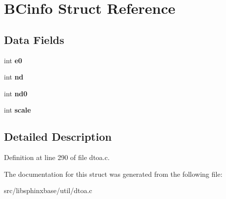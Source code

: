 \section{B\-Cinfo Struct Reference}
\label{structBCinfo}
\subsection*{Data Fields}
\begin{DoxyCompactItemize}
\item 
int {\bfseries e0}\label{structBCinfo_a3465f7cb1203532a3dc29c5a01e05526}

\item 
int {\bfseries nd}\label{structBCinfo_ac189da9f6f82f8846017c40e5872e4a7}

\item 
int {\bfseries nd0}\label{structBCinfo_a9d30accd41a03e88ebd52591258b76fa}

\item 
int {\bfseries scale}\label{structBCinfo_a59b720f0388e80e21b950723aa53b56e}

\end{DoxyCompactItemize}


\subsection{Detailed Description}


Definition at line 290 of file dtoa.\-c.



The documentation for this struct was generated from the following file\-:\begin{DoxyCompactItemize}
\item 
src/libsphinxbase/util/dtoa.\-c\end{DoxyCompactItemize}
